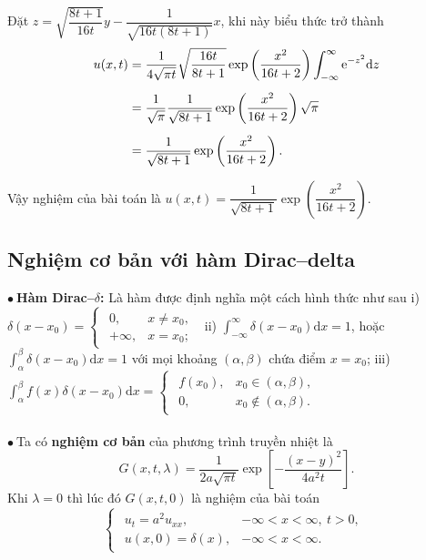 \documentclass[10pt, a4paper]{article}
\begin{document}
	Đặt $z=\sqrt{\dfrac{8t+1}{16t}}y-\dfrac{1}{\sqrt{16t(8t+1)}}x$, khi này biểu thức trở thành \begin{align*}
		u(x,t)&=\frac{1}{4\sqrt{\pi t}}\sqrt{\frac{16t}{8t+1}}\exp\left(\frac{x^2}{16t+2}\right)\int_{-\infty}^\infty\mathrm e^{-z^2}\mathrm dz\\
		\noalign{\vskip5pt}
		&=\frac{1}{\sqrt{\pi}}\frac{1}{\sqrt{8t+1}}\exp\left(\frac{x^2}{16t+2}\right)\sqrt\pi\\
		\noalign{\vskip5pt}
		&=\frac{1}{\sqrt{8t+1}}\exp\left(\frac{x^2}{16t+2}\right).
	\end{align*}
	
	Vậy nghiệm của bài toán là $u(x,t)=\dfrac{1}{\sqrt{8t+1}}\exp\left(\dfrac{x^2}{16t+2}\right).$
	\subsection{Nghiệm cơ bản với hàm Dirac--delta}
	\vspace{2mm}
	$\bullet~$\textbf{\color{red}Hàm Dirac--$\delta$:} Là hàm được định nghĩa một cách hình thức như sau
	\vskip7pt
	i) $\delta(x-x_0)=\begin{cases}
		\begin{array}{ll}
			0, & x\ne x_0, \\
			+\infty, & x=x_0;
		\end{array}
	\end{cases}$
	\vskip7pt
	ii) $\displaystyle\int_{-\infty}^\infty\delta(x-x_0)\text{d}x=1$, hoặc $\displaystyle\int_\alpha^\beta\delta(x-x_0)\text{d}x=1$ với mọi khoảng $(\alpha,\beta)$ chứa điểm $x=x_0$;
	\vskip7pt
	iii) $\displaystyle\int_\alpha^\beta f(x)\delta(x-x_0)\text{d}x=\begin{cases}
		\begin{array}{ll}
			f(x_0), & x_0\in(\alpha,\beta),\\
			0, & x_0\notin(\alpha,\beta).
		\end{array}
	\end{cases}$\\\\
	$\bullet~$Ta có \textbf{\color{red}nghiệm cơ bản} của phương trình truyền nhiệt là $$G(x,t,\lambda)=\dfrac{1}{2a\sqrt{\pi t}}\exp\left[-\frac{(x-y)^2}{4a^2t}\right].$$
	Khi $\lambda=0$ thì lúc đó $G(x,t,0)$ là nghiệm của bài toán $$\begin{cases}
		\begin{array}{ll}
			u_t=a^2u_{xx}, & -\infty<x<\infty,~t>0,\\
			u(x,0)=\delta(x), & -\infty<x<\infty.
		\end{array}
	\end{cases}$$
\end{document}
